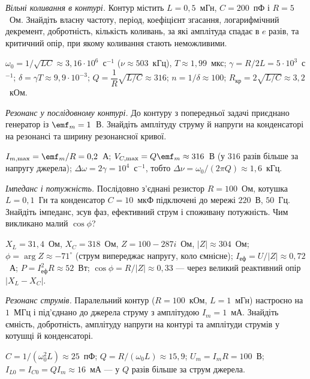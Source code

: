 \begin{problem}\label{prb:FreeOscillationsNumbers}
	\emph{Вільні коливання в контурі.} Контур містить $L=0{,}5$~мГн, $C=200$~пФ і $R=5$~Ом. Знайдіть власну частоту, період, коефіцієнт згасання, логарифмічний декремент, добротність, кількість коливань, за які амплітуда спадає в $e$ разів, та критичний опір, при якому коливання стають неможливими.
	\begin{solution}
		$\omega_0=1/\sqrt{LC}\approx3{,}16\cdot10^{6}$~с$^{-1}$ ($\nu\approx503$~кГц), $T\approx1{,}99$~мкс; $\gamma=R/2L=5\cdot10^{3}$~с$^{-1}$; $\delta=\gamma T\approx9{,}9\cdot10^{-3}$; $Q=\dfrac{1}{R}\sqrt{L/C}\approx316$; $n=1/\delta\approx100$; $R_\text{кр}=2\sqrt{L/C}\approx3{,}2$~кОм.
	\end{solution}
\end{problem}

\begin{problem}\label{prb:ForcedResonanceNumbers}
	\emph{Резонанс у послідовному контурі.} До контуру з попередньої задачі приєднано генератор із $\emf_m=1$~В. Знайдіть амплітуду струму й напруги на конденсаторі на резонансі та ширину резонансної кривої.
	\begin{solution}
		$I_{m,\max}=\emf_m/R=0{,}2$~А; $V_{C,\max}=Q\emf_m\approx316$~В (у $316$ разів більше за напругу джерела); $\Delta\omega=2\gamma=10^{4}$~с$^{-1}$, тобто $\Delta\nu=\omega_0/(2\pi Q)\approx1{,}6$~кГц.
	\end{solution}
\end{problem}

\begin{problem}\label{prb:ImpedanceNumbers}
	\emph{Імпеданс і потужність.} Послідовно з'єднані резистор $R=100$~Ом, котушка $L=0{,}1$~Гн та конденсатор $C=10$~мкФ підключені до мережі $220$~В, $50$~Гц. Знайдіть імпеданс, зсув фаз, ефективний струм і споживану потужність. Чим викликано малий $\cos\phi$?
	\begin{solution}
		$X_L=31{,}4$~Ом, $X_C=318$~Ом, $Z=100-287i$~Ом, $|Z|\approx304$~Ом; $\phi=\arg Z\approx-71^\circ$ (струм випереджає напругу, коло ємнісне); $I_\text{еф}=U/|Z|\approx0{,}72$~А; $P=I_\text{еф}^2R\approx52$~Вт; $\cos\phi=R/|Z|\approx0{,}33$ --- через великий реактивний опір $|X_L-X_C|$.
	\end{solution}
\end{problem}

\begin{problem}\label{prb:ParallelResonanceNumbers}
	\emph{Резонанс струмів.} Паралельний контур ($R=100$~кОм, $L=1$~мГн) настроєно на $1$~МГц і під'єднано до джерела струму з амплітудою $I_m=1$~мА. Знайдіть ємність, добротність, амплітуду напруги на контурі та амплітуди струмів у котушці й конденсаторі.
	\begin{solution}
		$C=1/(\omega_0^2L)\approx25$~пФ; $Q=R/(\omega_0L)\approx15{,}9$; $U_m=I_mR=100$~В; $I_{L0}=I_{C0}=QI_m\approx16$~мА --- у $Q$ разів більше за струм джерела.
	\end{solution}
\end{problem}

